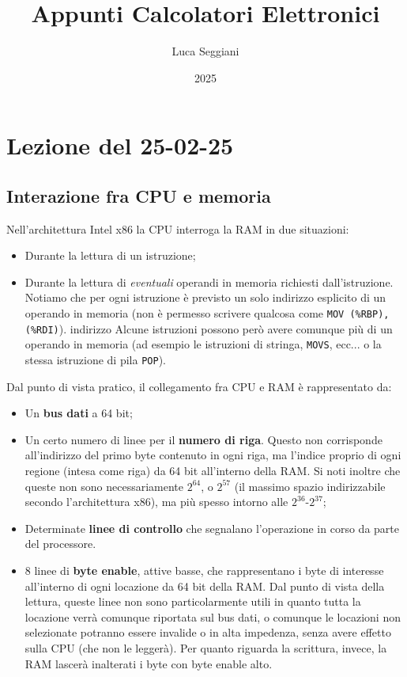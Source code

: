 \documentclass[a4paper,11pt]{article}
\title{Appunti Calcolatori Elettronici}
\author{Luca Seggiani}
\date{2025}
\begin{document}
\section{Lezione del 25-02-25}

\thispagestyle{empty}
\pagestyle{fancy}

\subsection{Interazione fra CPU e memoria}
Nell'architettura Intel x86 la CPU interroga la RAM in due situazioni:
\begin{itemize}
	\item Durante la lettura di un istruzione;
	\item Durante la lettura di \textit{eventuali} operandi in memoria richiesti dall'istruzione.
		Notiamo che per ogni istruzione è previsto un solo indirizzo esplicito di un operando in memoria (non è permesso scrivere qualcosa come \lstinline|MOV (%RBP), (%RDI)|). indirizzo
		Alcune istruzioni possono però avere comunque più di un operando in memoria (ad esempio le istruzioni di stringa, \lstinline|MOVS|, ecc... o la stessa istruzione di pila \lstinline|POP|).
\end{itemize}

Dal punto di vista pratico, il collegamento fra CPU e RAM è rappresentato da:
\begin{itemize}
	\item Un \textbf{bus dati} a 64 bit;
	\item Un certo numero di linee per il \textbf{numero di riga}. Questo non corrisponde all'indirizzo del primo byte contenuto in ogni riga, ma l'indice proprio di ogni regione (intesa come riga) da 64 bit all'interno della RAM. Si noti inoltre che queste non sono necessariamente $2^{64}$, o $2^{57}$ (il massimo spazio indirizzabile secondo l'architettura x86), ma più spesso intorno alle $2^{36}$-$2^{37}$;
	\item Determinate \textbf{linee di controllo} che segnalano l'operazione in corso da parte del processore.
	\item 8 linee di \textbf{byte enable}, attive basse, che rappresentano i byte di interesse all'interno di ogni locazione da 64 bit della RAM. Dal punto di vista della lettura, queste linee non sono particolarmente utili in quanto tutta la locazione verrà comunque riportata sul bus dati, o comunque le locazioni non selezionate potranno essere invalide o in alta impedenza, senza avere effetto sulla CPU (che non le leggerà). Per quanto riguarda la scrittura, invece, la RAM lascerà inalterati i byte con byte enable alto. 
\end{itemize}
\end{document}
